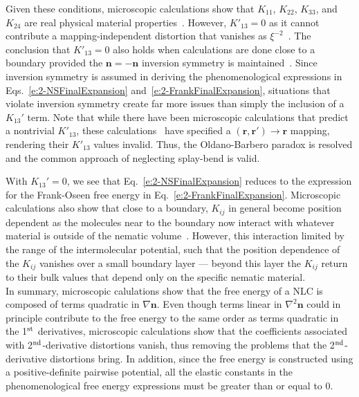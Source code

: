 Given these conditions, microscopic calculations show that $K_{11}$, $K_{22}$, $K_{33}$, and $K_{24}$ are real physical material properties~\cite{RN55,RN56,RN225,RN224,RN217,RN222}.
However, $K'_{13} = 0$ as it cannot contribute a mapping-independent distortion that vanishes as $\xi^{-2}$~\cite{RN55,RN225}.
The conclusion that $K'_{13} = 0$ also holds when calculations are done close to a boundary provided the $\mathbf{n} = -\mathbf{n}$ inversion symmetry is maintained~\cite{RN56}.
Since inversion symmetry is assumed in deriving the phenomenological expressions in Eqs.~\ref{e:2-NSFinalExpansion} and~\ref{e:2-FrankFinalExpansion}, situations that violate inversion symmetry create far more issues than simply the inclusion of a $K_{13}'$ term.
Note that while there have been microscopic calculations that predict a nontrivial $K'_{13}$, these calculations~\cite{RN224,RN217,RN222} have specified a $(\mathbf{r},\mathbf{r}') \rightarrow \mathbf{r}$ mapping, rendering their $K'_{13}$ values invalid.
Thus, the Oldano-Barbero paradox is resolved and the common approach of neglecting splay-bend is valid.

With $K_{13}'=0$, we see that Eq.~\ref{e:2-NSFinalExpansion} reduces to the expression for the Frank-Oseen free energy in Eq.~\ref{e:2-FrankFinalExpansion}.
Microscopic calculations also show that close to a boundary, $K_{ij}$ in general become position dependent as the molecules near to the boundary now interact with whatever material is outside of the nematic volume~\cite{RN56,RN57,RN55}.
However, this interaction limited by the range of the intermolecular potential, such that the position dependence of the $K_{ij}$ vanishes over a small boundary layer --- beyond this layer the $K_{ij}$ return to their bulk values that depend only on the specific nematic material.\\


In summary, microscopic calulations show that the free energy of a NLC is composed of terms quadratic in $\nabla \mathbf{n}$.
Even though terms linear in $\nabla ^2 \mathbf{n}$ could in principle contribute to the free energy to the same order as terms quadratic in the 1$^\textup{\rm st}$ derivatives, microscopic calculations show that the coefficients associated with 2$^\textup{\rm nd}$-derivative distortions vanish, thus removing the problems that the 2$^\textup{\rm nd}$-derivative distortions bring.
In addition, since the free energy is constructed using a positive-definite pairwise potential, all the elastic constants in the phenomenological free energy expressions must be greater than or equal to 0.


